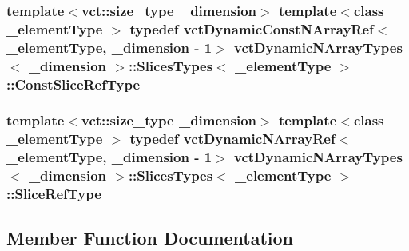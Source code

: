 \subsubsection[{Const\+Slice\+Ref\+Type}]{\setlength{\rightskip}{0pt plus 5cm}template$<$vct\+::size\+\_\+type \+\_\+dimension$>$ template$<$class \+\_\+element\+Type $>$ typedef {\bf vct\+Dynamic\+Const\+N\+Array\+Ref}$<$\+\_\+element\+Type, \+\_\+dimension -\/ 1$>$ {\bf vct\+Dynamic\+N\+Array\+Types}$<$ \+\_\+dimension $>$\+::{\bf Slices\+Types}$<$ \+\_\+element\+Type $>$\+::{\bf Const\+Slice\+Ref\+Type}}\label{classvct_dynamic_n_array_types_1_1_slices_types_acf1ea70846d0d2739fce728d3c99bde3}
\hypertarget{classvct_dynamic_n_array_types_1_1_slices_types_a3eac136f0c4ca03f30cf55cdd608ebf8}{}
\subsubsection[{Slice\+Ref\+Type}]{\setlength{\rightskip}{0pt plus 5cm}template$<$vct\+::size\+\_\+type \+\_\+dimension$>$ template$<$class \+\_\+element\+Type $>$ typedef {\bf vct\+Dynamic\+N\+Array\+Ref}$<$\+\_\+element\+Type, \+\_\+dimension -\/ 1$>$ {\bf vct\+Dynamic\+N\+Array\+Types}$<$ \+\_\+dimension $>$\+::{\bf Slices\+Types}$<$ \+\_\+element\+Type $>$\+::{\bf Slice\+Ref\+Type}}\label{classvct_dynamic_n_array_types_1_1_slices_types_a3eac136f0c4ca03f30cf55cdd608ebf8}


\subsection{Member Function Documentation}
\hypertarget{classvct_dynamic_n_array_types_1_1_slices_types_abe488b76fc50cdd72bfb980b5a16398d}{}
